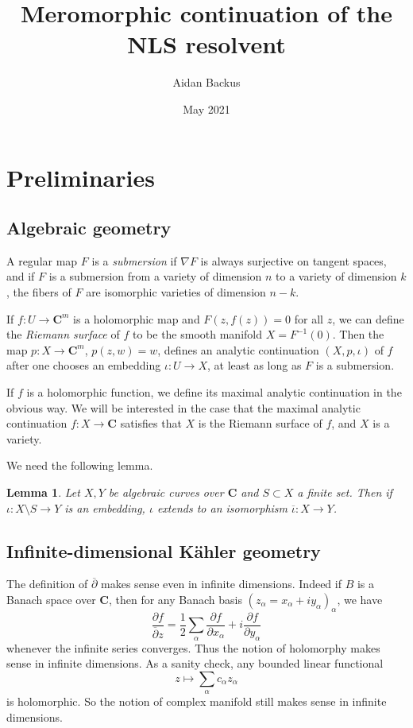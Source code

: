 \documentclass[reqno,12pt,letterpaper]{amsart}
\title[Meromorphic continuation of the NLS resolvent]{Meromorphic continuation of the NLS resolvent}
\author{Aidan Backus}
\date{May 2021}
\newcommand{\CC}{\mathbf{C}}
\newcommand{\dbar}{\overline \partial}
\newcommand{\dfn}[1]{\emph{#1}\index{#1}}
\newtheorem{lemma}[theorem]{Lemma}
\theoremstyle{definition}
\begin{document}
\begin{abstract}
\end{abstract}

\maketitle

\tableofcontents

\section{Preliminaries}
\subsection{Algebraic geometry}
A regular map $F$ is a \dfn{submersion} if $\nabla F$ is always surjective on tangent spaces, and if $F$ is a submersion from a variety of dimension $n$ to a variety of dimension $k$, the fibers of $F$ are isomorphic varieties of dimension $n - k$.

If $f: U \to \CC^m$ is a holomorphic map and $F(z, f(z)) = 0$ for all $z$, we can define the \emph{Riemann surface} of $f$ to be the smooth manifold $X = F^{-1}(0)$. Then the map $p: X \to \CC^m$, $p(z, w) = w$, defines an analytic continuation $(X, p, \iota)$ of $f$ after one chooses an embedding $\iota: U \to X$, at least as long as $F$ is a submersion.

If $f$ is a holomorphic function, we define its maximal analytic continuation in the obvious way.
We will be interested in the case that the maximal analytic continuation $f: X \to \CC$ satisfies that $X$ is the Riemann surface of $f$, and $X$ is a variety.

We need the following lemma.
\begin{lemma}
\label{compact Riemann surfaces}
Let $X, Y$ be algebraic curves over $\CC$ and $S \subset X$ a finite set. Then if $\iota: X \setminus S \to Y$ is an embedding, $\iota$ extends to an isomorphism $\overline \iota: X \to Y$.
\end{lemma}

\subsection{Infinite-dimensional K\"ahler geometry}
The definition of $\dbar$ makes sense even in infinite dimensions.
Indeed if $B$ is a Banach space over $\CC$, then for any Banach basis $(z_\alpha = x_\alpha + iy_\alpha)_\alpha$, we have
$$\frac{\partial f}{\dbar z} = \frac{1}{2} \sum_\alpha \frac{\partial f}{\partial x_\alpha} + i\frac{\partial f}{\partial y_\alpha}$$
whenever the infinite series converges.
Thus the notion of holomorphy makes sense in infinite dimensions.
As a sanity check, any bounded linear functional
$$z \mapsto \sum_\alpha c_\alpha z_\alpha$$
is holomorphic.
So the notion of complex manifold still makes sense in infinite dimensions.
\end{document}
